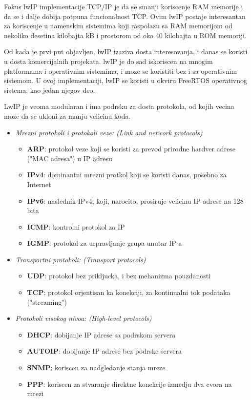 \documentclass[a4paper,12pt, master]{etf}
\begin{document}
	Fokus lwIP implementacije TCP/IP je da se smanji koriscenje RAM memorije i da se i dalje 
	dobija potpuna funcionalnost TCP. Ovim lwIP postaje interesantan za koriscenje u namenskim 
	sistemima koji raspolazu sa RAM memorijom od nekoliko desetina kilobajta kB i prostorom od 
	oko 40 kilobajta u ROM memoriji.

	Od kada je prvi put objavljen, lwIP izaziva dosta interesovanja, i danas se koristi u dosta
	komercijalnih projekata. lwIP je do sad iskoriscen na mnogim platformama i operativnim
	sistemima, i moze se koristiti bez i sa operativnim sistemom. U ovoj implementaciji, lwIP 
	se koristi u okviru FreeRTOS operativnog sistema, kao jedan njegov deo.

	LwIP je veoma modularan i ima podrsku za dosta protokola, od kojih vecina moze da se 
	ukloni za manju velicinu koda.
	\begin{itemize}
		\item \textit{Mrezni protokoli i protokoli veze: (Link and network protocols)}
		\begin{itemize}
			\item \textbf{ARP}: protokol veze koji se koristi za prevod prirodne hardver adrese
			("MAC adresa") u IP adresu
			\item \textbf{IPv4}: dominantni mrezni protkol koji se koristi danas, posebno za
			Internet
			\item \textbf{IPv6}: naslednik IPv4, koji, narocito, prosiruje velicinu IP adrese 
			na 128 bita
			\item \textbf{ICMP}: kontrolni protokol za IP
			\item \textbf{IGMP}: protokol za urpravljanje grupa unutar IP-a
		\end{itemize}
		\item \textit{Transportni protokoli: (Transport protocols)}
			\begin{itemize}
				\item \textbf{UDP}: protokol bez prikljucka, i bez mehanizma pouzdanosti
				\item \textbf{TCP}: protokol orjentisan ka konekciji, za kontinualni tok 
				podataka ("streaming")
			\end{itemize}
		\item \textit{Protokoli visokog nivoa: (High-level protocols)}
			\begin{itemize}
				\item \textbf{DHCP}: dobijanje IP adrese sa podrskom servera
				\item \textbf{AUTOIP}: dobijanje IP adrese bez podrske servera
				\item \textbf{SNMP}: koriscen za nadgledanje stanja mreze
				\item \textbf{PPP}: koriscen za stvaranje direktne konekcije izmedju dva cvora 
				na mrezi
			\end{itemize}
	\end{itemize}
\end{document}
